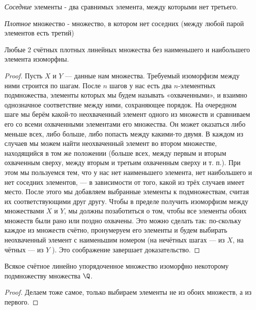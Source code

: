 \begin{definition} \thmslashn

	\textit{Соседние} элементы - два сравнимых элемента, между которыми нет третьего.
	
	\textit{Плотное} множество - множество, в котором нет соседних (между любой парой элементов есть третий)
\end{definition}

\begin{theorem} \thmslashn

	Любые 2 счётных плотных линейных множества без наименьшего и наибольшего элемента изоморфны.
	\begin{proof} \thmslashn
		
		Пусть $X$ и $Y$ — данные нам множества. Требуемый изоморфизм между ними строится по шагам. После $n$ шагов у нас есть два
		$n$-элементных подмножества, элементы которых мы будем называть «охваченными», и взаимно однозначное соответствие между ними, 
		сохраняющее порядок. На очередном шаге мы берём какой-то неохваченный элемент одного из множеств и сравниваем его со всеми охваченными 
		элементами его множества. Он может оказаться либо меньше всех, либо больше, либо попасть между какими-то двумя. В каждом из случаев мы можем 
		найти неохваченный элемент во втором множестве, находящийся в том же положении (больше всех, между первым и вторым охваченным сверху, между 
		вторым и третьим охваченным сверху и т. п.). При этом мы пользуемся тем, что у нас нет наименьшего элемента, нет наибольшего и нет 
		соседних элементов, — в зависимости от того, какой из трёх случаев имеет место. После этого мы добавляем выбранные элементы к подмножествам, считая их соответствующими друг другу.
		Чтобы в пределе получить изоморфизм между множествами $X$ и $Y$, мы должны позаботиться о том, чтобы все элементы обоих множеств были рано или поздно охвачены. Это можно сделать так: 
		по-скольку каждое из множеств счётно, пронумеруем его элементы и будем выбирать неохваченный элемент с наименьшим номером (на 
		нечётных шагах — из $X$, на чётных — из $Y$ ). Это соображение завершает доказательство.
	\end{proof}
\end{theorem}

\begin{theorem} \thmslashn

	Всякое счётное линейно упорядоченное множество изоморфно некоторому подмножеству множества $\Q$.
	\begin{proof} \thmslashn
	
		Делаем тоже самое, только выбираем элементы не из обоих множеств, а из первого.
	\end{proof}
\end{theorem}
